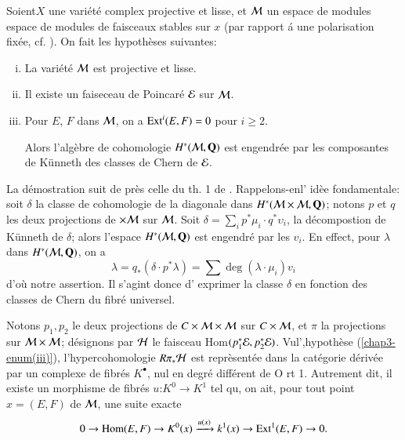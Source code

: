 \newpage

\begin{prop*}
Soient\pageoriginale $X$ une vari\'et\'e complex projective et lisse, et $\mathcal{M}$ un espace de modules espace de modules de faisceaux stables sur $x$ (par rapport \'a une polarisation fix\'ee, cf. \cite{chap3-keyM}). On fait les hypoth\`eses suivantes:
\begin{enumerate}[(i)]
\item La vari\'et\'e $\mathcal{M}$ est projective et lisse.\label{chap3-enum(i)}
\item Il existe un faiseceau de Poincar\'e $\mathcal{E}$ sur $\mathcal{M}$.\label{chap3-enum(ii)}
\item Pour $E$, $F$ dans $\mathcal{M}$, on a $\operatorname{Ext}^{i}(E, F) =0$ pour $i\geq 2$.\label{chap3-enum(iii)}

Alors l'alg\`ebre de cohomologie $H^{*}(\mathcal{M}, \mathbf{Q})$ est engendr\'ee par les composantes de K\"unneth des classes de Chern de $\mathcal{E}$.   
\end{enumerate}
\end{prop*}

La d\'emostration suit de pr\`es celle du th. 1 de \cite{chap3-keyE-S}. Rappelons-enl' id\`ee fondamentale: soit $\delta$ la classe de cohomologie de la diagonale dans $H^{*}(\mathcal{M} \times \mathcal{M}, \mathbf{Q})$; notons $p$ et $q$ les deux projections de $\cal \times M$ sur $\mathcal{M}$. Soit $\delta = \sum\limits_{i}p^{*}\mu_{i} \cdot q^{*} \upsilon_{i}$, la d\'ecompostion de K\"unneth de $\delta$; alors l'espace $H^{*}(\mathcal{M}, \mathbf{Q})$ est engendr\'e par les $v_{i}$. En effect, pour $\lambda$ dans $H^{*}(\mathcal{M}, \mathbf{Q})$, on a
$$
\lambda = q_{*}(\delta \cdot p^{*}\lambda) = \sum\deg(\lambda \cdot \mu_{i})v_{i}
$$
d'o\`u notre assertion. Il s'agint donce d' exprimer la classe $\delta$ en fonction des classes de Chern du fibr\'e universel.

Notons $p_{1}, p_{2}$ le deux projections de $C\times \mathcal{M} \times \mathcal{M}$ sur $C \times \mathcal{M}$, et $\pi$ la projections sur  $\mathcal{M} \times \mathcal{M}$; d\'esignons par $\mathcal{H}$ le faisceau Hom$(p_{1}^{*}\mathcal{E}, p_{2}^{*}\mathcal{E})$. Vul',hypoth\`ese (\ref{chap3-enum(iii)}), l'hypercohomologie $R\pi_{*}\mathcal{H}$ est repr\`esent\'ee dans la cat\'egorie d\'eriv\'ee par un complexe de fibr\'es $K^{\bullet}$, nul en degr\'e diff\'erent de O rt 1. Autrement dit, il existe un morphisme de fibr\'es $u$:$K^{0}\longrightarrow K^{1}$ tel qu, on ait, pour tout point $x=(E, F)$ de $\mathcal{M}$, une suite exacte
$$
0 \rightarrow \operatorname{Hom}(E, F) \rightarrow  K^{0}(x)\xrightarrow{u(x)}k^{1}(x)\rightarrow \operatorname{Ext}^{1}(E, F) \rightarrow 0.
$$

